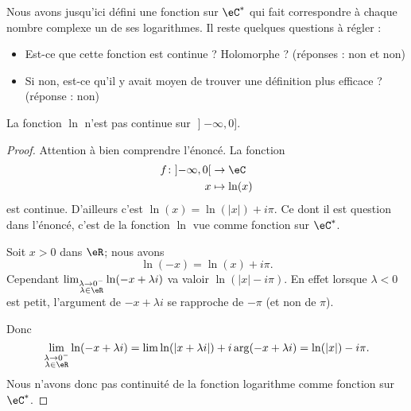 Nous avons jusqu'ici défini une fonction sur \( \eC^*\) qui fait correspondre à chaque nombre complexe un de ses logarithmes. Il reste quelques questions à régler :
\begin{itemize}
    \item Est-ce que cette fonction est continue ? Holomorphe ? (réponses : non et non)
    \item Si non, est-ce qu'il y avait moyen de trouver une définition plus efficace ? (réponse : non)
\end{itemize}

\begin{lemma}
La fonction \( \ln\) n'est pas continue sur \( \mathopen] -\infty , 0 \mathclose]\).
\end{lemma}

\begin{proof}
    Attention à bien comprendre l'énoncé. La fonction
    \begin{equation}
        \begin{aligned}
        f\colon \mathopen] -\infty , 0 \mathclose[&\to \eC \\
            x&\mapsto \ln(x)
        \end{aligned}
    \end{equation}
    est continue. D'ailleurs c'est \( \ln(x)=\ln(| x |)+i\pi\). Ce dont il est question dans l'énoncé, c'est de la fonction \( \ln\) vue comme fonction sur \( \eC^*\).

    Soit \( x>0\) dans \( \eR\); nous avons
    \begin{equation}
        \ln(-x)=\ln(x)+i\pi.
    \end{equation}
    Cependant \( \lim_{\substack{\lambda\to 0^-\\\lambda\in \eR}}\ln(-x+\lambda i) \) va valoir \( \ln(| x |-i\pi)\). En effet lorsque \( \lambda<0\) est petit, l'argument de \( -x+\lambda i\) se rapproche de \( -\pi\) (et non de \( \pi\)).

\begin{center}
   
\end{center}

Donc
\begin{equation}
    \lim_{\substack{\lambda\to 0^-\\\lambda\in \eR}}\ln(-x+\lambda i)=\lim \ln(| x+\lambda i |)+i\arg(-x+\lambda i)=\ln(| x |)-i\pi.
\end{equation}
Nous n'avons donc pas continuité de la fonction logarithme comme fonction sur \( \eC^*\).
\end{proof}

